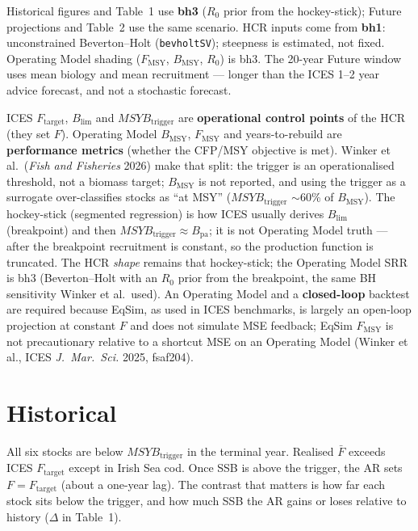 \documentclass[11pt,a4paper]{article}
\newcommand{\Fmsy}{F_{\mathrm{MSY}}}
\newcommand{\Ftar}{F_{\mathrm{target}}}
\newcommand{\Blim}{B_{\lim}}
\newcommand{\Btrig}{MSYB_{\mathrm{trigger}}}
\newcommand{\Bmsy}{B_{\mathrm{MSY}}}
\begin{document}
Historical figures and Table~1 use \textbf{bh3} ($R_0$ prior from the hockey-stick); Future projections and Table~2 use the same scenario. HCR inputs come from \textbf{bh1}: unconstrained Beverton--Holt (\texttt{bevholtSV}); steepness is estimated, not fixed. Operating Model shading ($F_{\mathrm{MSY}}$, $\Bmsy$, $R_0$) is bh3. The 20-year Future window uses mean biology and mean recruitment --- longer than the ICES 1--2 year advice forecast, and not a stochastic forecast.

ICES $\Ftar$, $\Blim$ and $MSYB_{\mathrm{trigger}}$ are \textbf{operational control points} of the HCR (they set $F$). Operating Model $\Bmsy$, $\Fmsy$ and years-to-rebuild are \textbf{performance metrics} (whether the CFP/MSY objective is met). Winker et al.\ (\emph{Fish and Fisheries} 2026) make that split: the trigger is an operationalised threshold, not a biomass target; $\Bmsy$ is not reported, and using the trigger as a surrogate over-classifies stocks as ``at MSY'' ($\Btrig$ $\sim$60\% of $\Bmsy$). The hockey-stick (segmented regression) is how ICES usually derives $\Blim$ (breakpoint) and then $\Btrig\approx B_{\mathrm{pa}}$; it is not Operating Model truth --- after the breakpoint recruitment is constant, so the production function is truncated. The HCR \emph{shape} remains that hockey-stick; the Operating Model SRR is bh3 (Beverton--Holt with an $R_0$ prior from the breakpoint, the same BH sensitivity Winker et al.\ used). An Operating Model and a \textbf{closed-loop} backtest are required because EqSim, as used in ICES benchmarks, is largely an open-loop projection at constant $F$ and does not simulate MSE feedback; EqSim $\Fmsy$ is not precautionary relative to a shortcut MSE on an Operating Model (Winker et al., ICES \emph{J.\ Mar.\ Sci.} 2025, fsaf204).

\section{Historical}

All six stocks are below $\Btrig$ in the terminal year. Realised $\bar F$ exceeds ICES $\Ftar$ except in Irish Sea cod. Once SSB is above the trigger, the AR sets $F=\Ftar$ (about a one-year lag). The contrast that matters is how far each stock sits below the trigger, and how much SSB the AR gains or loses relative to history ($\Delta$ in Table~1).
\end{document}
